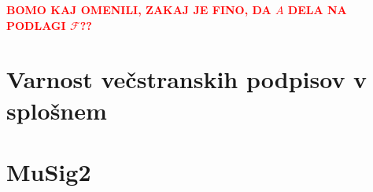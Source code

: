 \documentclass[isrm2, tisk]{fmfdelo}
\newcommand{\todo}[1]{\textcolor{red}{\textbf{\uppercase{#1}??}}}
\begin{document}
\todo{bomo kaj omenili, zakaj je fino, da $A$ dela na podlagi $\mathcal{F}$}

\section{Varnost večstranskih podpisov v splošnem}
\section{MuSig2}

%
%
%
\end{document}

